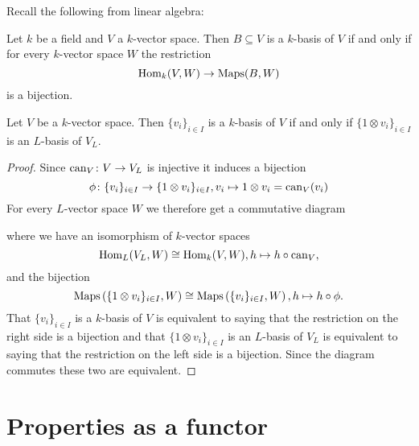 Recall the following from linear algebra:


\begin{rec}
 Let $k$ be a field and $V$ a $k$-vector space. Then $B \subseteq V$ is a $k$-basis of $V$ if and only if for every $k$-vector space $W$ the restriction
 \[
  \operatorname{Hom}_k(V,W) \to \operatorname{Maps}(B,W)
 \]
 is a bijection.
\end{rec}


\begin{lem}
 Let $V$ be a $k$-vector space. Then $\{v_i\}_{i \in I}$ is a $k$-basis of $V$ if and only if $\{1 \otimes v_i\}_{i \in I}$ is an $L$-basis of $V_L$.
\end{lem}
\begin{proof}
 Since $\operatorname{can}_V \colon V \to V_L$ is injective it induces a bijection
 \[
  \phi \colon \{v_i\}_{i \in I} \to \{1 \otimes v_i\}_{i \in I}, v_i \mapsto 1 \otimes v_i = \operatorname{can}_V(v_i)
 \]
 For every $L$-vector space $W$ we therefore get a commutative diagram
 \begin{center}
 \end{center}
 where we have an isomorphism of $k$-vector spaces
 \[
  \operatorname{Hom}_L(V_L, W) \cong \operatorname{Hom}_k(V, W), h \mapsto h \circ \operatorname{can}_V,
 \]
 and the bijection
 \[
  \operatorname{Maps}\left( \{1 \otimes v_i\}_{i \in I}, W\right ) \cong \operatorname{Maps}\left( \{v_i\}_{i \in I} ,W\right ), h \mapsto h \circ \phi.
 \]
 That $\{v_i\}_{i \in I}$ is a $k$-basis of $V$ is equivalent to saying that the restriction on the right side is a bijection and that $\{1 \otimes v_i\}_{i \in I}$ is an $L$-basis of $V_L$ is equivalent to saying that the restriction on the left side is a bijection. Since the diagram commutes these two are equivalent.
\end{proof}





\section{Properties as a functor}


